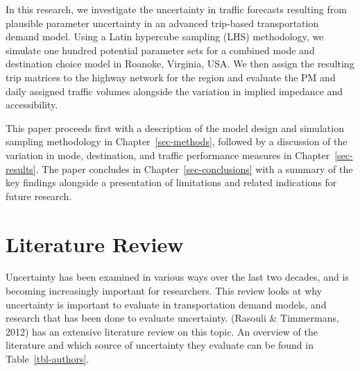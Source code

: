\documentclass[
  letterpaper,
  number,
  review,
  3p]{elsarticle}
\begin{document}
In this research, we investigate the uncertainty in traffic forecasts
resulting from plausible parameter uncertainty in an advanced trip-based
transportation demand model. Using a Latin hypercube sampling (LHS)
methodology, we simulate one hundred potential parameter sets for a
combined mode and destination choice model in Roanoke, Virginia, USA. We
then assign the resulting trip matrices to the highway network for the
region and evaluate the PM and daily assigned traffic volumes alongside
the variation in implied impedance and accessibility.

This paper proceeds first with a description of the model design and
simulation sampling methodology in Chapter~\ref{sec-methods}, followed
by a discussion of the variation in mode, destination, and traffic
performance measures in Chapter~\ref{sec-results}. The paper concludes
in Chapter~\ref{sec-conclusions} with a summary of the key findings
alongside a presentation of limitations and related indications for
future research.


\section{Literature Review}\label{literature-review}

Uncertainty has been examined in various ways over the last two decades,
and is becoming increasingly important for researchers. This review
looks at why uncertainty is important to evaluate in transportation
demand models, and research that has been done to evaluate uncertainty.
(Rasouli \& Timmermans, 2012) has an extensive literature review on this
topic. An overview of the literature and which source of uncertainty
they evaluate can be found in Table~\ref{tbl-authors}.
\end{document}
